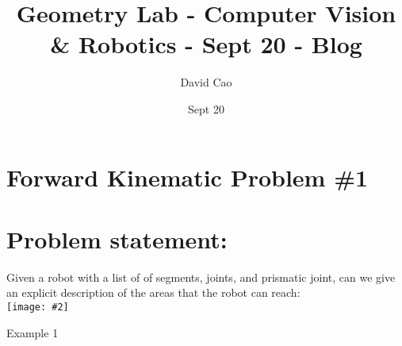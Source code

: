 \documentclass[11pt]{article}
\title{Geometry Lab - Computer Vision \& Robotics - Sept 20 - Blog}
\author{David Cao}
\date{Sept 20}
\newcommand{\image}[2]{\texttt{[image: \#2]}}
\begin{document}
\maketitle

\section*{Forward Kinematic Problem \#1}
\section{Problem statement:}
Given a robot with a list of of segments, joints, and prismatic joint, can we give an explicit description of the areas that the robot can reach:
\vspace{3em} \\
\image{0.75}{img1}\\
\begin{center}
  Example 1
\end{center}
\end{document}
